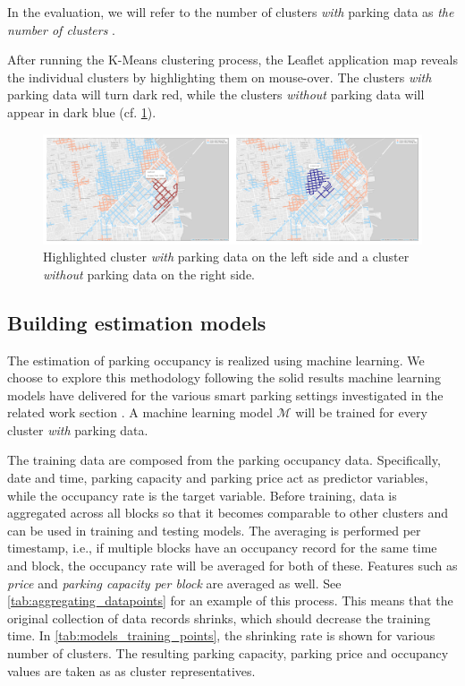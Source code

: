\documentclass{ws-ijait}
\newcommand{\cmmnt}[1]{\ignorespaces}
\begin{document}
	In the evaluation, we will refer to the number of clusters \textit{with} parking data as \textit{the number of clusters} \cmmnt{do we need this convention?}.	
	
	After running the K-Means clustering process, the Leaflet application map reveals the individual clusters by highlighting them on mouse-over. The clusters \textit{with} parking data will turn dark red, while the clusters \textit{without} parking data will appear in dark blue (cf. \cref{fig:highlighted_collage}). 
	
	\begin{figure}[!ht]
		\centering
		\includegraphics[width=\textwidth]{../graphics/highlighted_collage.png}
		\caption{Highlighted cluster \textit{with} parking data on the left side and a cluster \textit{without} parking data on the right side.}
		\label{fig:highlighted_collage}
	\end{figure}
	
	\subsection{Building estimation models}
	The estimation of parking occupancy is realized using machine learning. We choose to explore this methodology following the solid results machine learning models have delivered for the various smart parking settings investigated in the related work section \cmmnt{\cref{sec:relwork}}. A machine learning model $\mathcal{M}$ will be trained for every cluster \textit{with} parking data.
	
	The training data are composed from the parking occupancy data. Specifically, date and time, parking capacity and parking price act as predictor variables, while the occupancy rate is the target variable. Before training, data is aggregated across all blocks so that it becomes comparable to other clusters and can be used in training and testing models. The averaging is performed per timestamp, i.e., if multiple blocks have an occupancy record for the same time and block, the occupancy rate will be averaged for both of these. Features such as \textit{price} and \textit{parking capacity per block} are averaged as well. See \cref{tab:aggregating_datapoints} for an example of this process. This means that the original collection of data records shrinks, which should decrease the training time. In \cref{tab:models_training_points}, the shrinking rate is shown for various number of clusters. The resulting parking capacity, parking price and occupancy values are taken as as cluster representatives.
	
\end{document}
